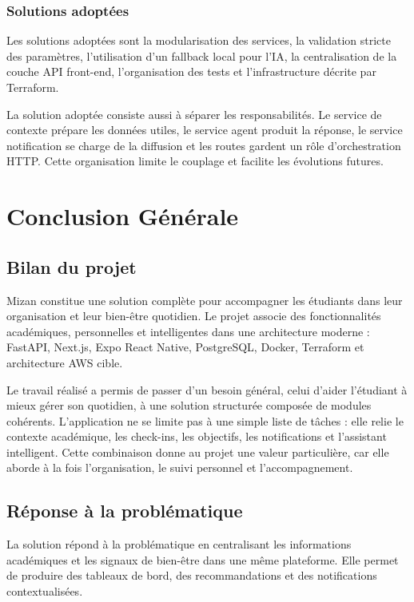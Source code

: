 \documentclass{rapportENSET}
\begin{document}
\subsubsection*{Solutions adoptées}
Les solutions adoptées sont la modularisation des services, la validation stricte des paramètres, l'utilisation d'un fallback local pour l'IA, la centralisation de la couche API front-end, l'organisation des tests et l'infrastructure décrite par Terraform.

La solution adoptée consiste aussi à séparer les responsabilités. Le service de contexte prépare les données utiles, le service agent produit la réponse, le service notification se charge de la diffusion et les routes gardent un rôle d'orchestration HTTP. Cette organisation limite le couplage et facilite les évolutions futures.


\section*{Conclusion Générale}
\subsection*{Bilan du projet}
Mizan constitue une solution complète pour accompagner les étudiants dans leur organisation et leur bien-être quotidien. Le projet associe des fonctionnalités académiques, personnelles et intelligentes dans une architecture moderne : FastAPI, Next.js, Expo React Native, PostgreSQL, Docker, Terraform et architecture AWS cible.

Le travail réalisé a permis de passer d'un besoin général, celui d'aider l'étudiant à mieux gérer son quotidien, à une solution structurée composée de modules cohérents. L'application ne se limite pas à une simple liste de tâches : elle relie le contexte académique, les check-ins, les objectifs, les notifications et l'assistant intelligent. Cette combinaison donne au projet une valeur particulière, car elle aborde à la fois l'organisation, le suivi personnel et l'accompagnement.

\subsection*{Réponse à la problématique}
La solution répond à la problématique en centralisant les informations académiques et les signaux de bien-être dans une même plateforme. Elle permet de produire des tableaux de bord, des recommandations et des notifications contextualisées.
\end{document}
